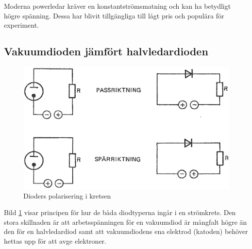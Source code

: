 Moderna powerledar kräver en konstantströmsmatning och kan ha betydligt
högre spänning.
Dessa har blivit tillgängliga till lågt pris och populära för experiment.

\subsection{Vakuumdioden jämfört halvledardioden}

\begin{figure}
\includegraphics[width=\textwidth]{images/cropped_pdfs/bild_2_2-15.pdf}
\caption{Dioders polarisering i kretsen}
\label{fig:BildII2-15}
\end{figure}

Bild \ref{fig:BildII2-15} visar principen för hur de båda diodtyperna ingår i
en strömkrets.
Den stora skillnaden är att arbetsspänningen för en vakuumdiod är mångfalt
högre än den för en halvledardiod samt att vakuumdiodens ena elektrod (katoden)
behöver hettas upp för att avge elektroner.

